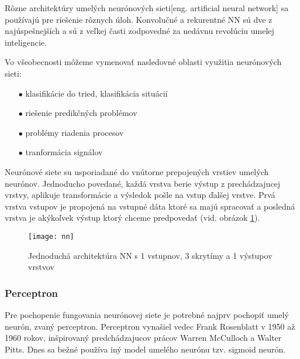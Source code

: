 Rôzne architektúry umelých neurónových sieti[eng. artificial neural network] sa používajú pre riešenie rôznych úloh.
Konvolučné a rekurentné NN sú dve z najúspešnejších a sú z veľkej časti zodpovedné za nedávnu revolúciu umelej inteligencie\cite{odkaz:CorrectionOfImageOrentation}.

Vo všeobecnosti môžeme vymenovať nasledovné oblasti využitia neurónových sieti\cite{odkaz:NNIntroduction}:
\begin{enumerate}
    \item[$\bullet$] klasifikácie do tried, klasifikácia situácií
    \item[$\bullet$] riešenie predikčných problémov
    \item[$\bullet$] problémy riadenia procesov
    \item[$\bullet$] tranformácia signálov
\end{enumerate}

Neurónové siete su usporiadané do vnútorne prepojených vrstiev umelých neurónov.
Jednoducho povedané, každá vrstva berie výstup z prechádzajucej vrstvy, aplikuje transformácie a výsledok pošle na vstup ďalšej vrstve.
Prvá vrstva vstupov je propojená na vstupné dáta ktoré sa majú spracovať a posledná vrstva je akýkoľvek výstup ktorý chceme predpovedať \cite{odkaz:CorrectionOfImageOrentation} (vid. obrázok \ref{pic:NNExample}).
\begin{figure}[H]
	\centering
	\texttt{[image: nn]}
	\caption{Jednoduchá architektúra NN s 1 vstupnov, 3 skrytímy a 1 výstupov vrstvov\cite{odkaz:CorrectionOfImageOrentation}}
	\label{pic:NNExample}
\end{figure}

\subsubsection{Perceptron}
Pre pochopenie fungovania neurónovej siete je potrebné najprv pochopiť umelý neurón, zvaný perceptron.
Perceptron vynašiel vedec Frank Rosenblatt v 1950 až 1960 rokov, inšpirovaný predchádzajucov prácov Warren McCulloch a Walter Pitts.
Dnes sa bežné používa iný model umelého neurónu tzv. sigmoid neurón\cite{odkaz:HandwrittenDigitRecognision}.

